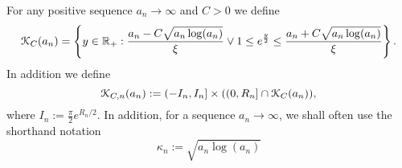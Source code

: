 For any positive sequence $a_n \to \infty$ and $C > 0$ we define
\begin{equation}\label{eq:def_K_C_set}
	{\mathcal K}_C(a_n) = \left\{y \in {\ensuremath{\mathbb R}}_+ : \frac{a_n - C \sqrt{a_n \log(a_n)}}{\xi} \vee 1 \le e^{\frac{y}{2}}
	\le \frac{a_n + C \sqrt{a_n \log(a_n)}}{\xi} \right\}.
\end{equation}
In addition we define
\begin{equation}\label{eq:def_K_C_n_set}
	{\mathcal K}_{C,n}(a_n) := (-I_n, I_n] \times ((0,R_n] \cap {\mathcal K}_{C}(a_n)),
\end{equation}
where $I_n := \frac{\pi}{2}e^{R_n/2}$. In addition, for a sequence $a_n \to \infty$, we shall often use the shorthand notation
\begin{equation}\label{eq:def_kappa_n}
	\kappa_n := \sqrt{a_n \log(a_n)}
\end{equation}



